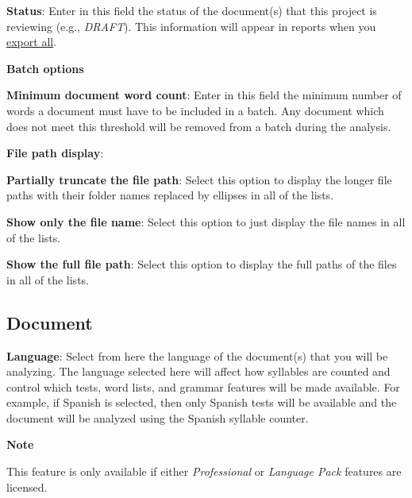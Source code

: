 \documentclass[
]{book}
\newenvironment{notesection}
    {
    \begin{tcolorbox}[colframe=mediumblue,colback=lightblue,coltext=mediumblue,arc=3mm]
    \faLightbulb[regular] \textbf{Note} \newline
    }
    {
    \end{tcolorbox}
    }
\theoremstyle{definition}
\theoremstyle{definition}
\theoremstyle{definition}
\theoremstyle{definition}
\theoremstyle{remark}
\begin{document}
\textbf{Status}: Enter in this field the status of the document(s) that this project is reviewing (e.g., \emph{DRAFT}). This information will appear in reports when you \protect\hyperlink{export-all-options}{export all}.

\textbf{Batch options}

\textbf{Minimum document word count}: Enter in this field the minimum number of words a document must have to be included in a batch. Any document which does not meet this threshold will be removed from a batch during the analysis.

\textbf{File path display}:

\textbf{Partially truncate the file path}: Select this option to display the longer file paths with their folder names replaced by ellipses in all of the lists.

\textbf{Show only the file name}: Select this option to just display the file names in all of the lists.

\textbf{Show the full file path}: Select this option to display the full paths of the files in all of the lists.

\hypertarget{options-document}{%
\subsection*{Document}\label{options-document}}

\textbf{Language}: Select from here the language of the document(s) that you will be analyzing. The language selected here will affect how syllables are counted and control which tests, word lists, and grammar features will be made available. For example, if Spanish is selected, then only Spanish tests will be available and the document will be analyzed using the Spanish syllable counter.

\begin{notesection}
This feature is only available if either \emph{Professional} or \emph{Language Pack} features are licensed.

\end{notesection}
\end{document}
